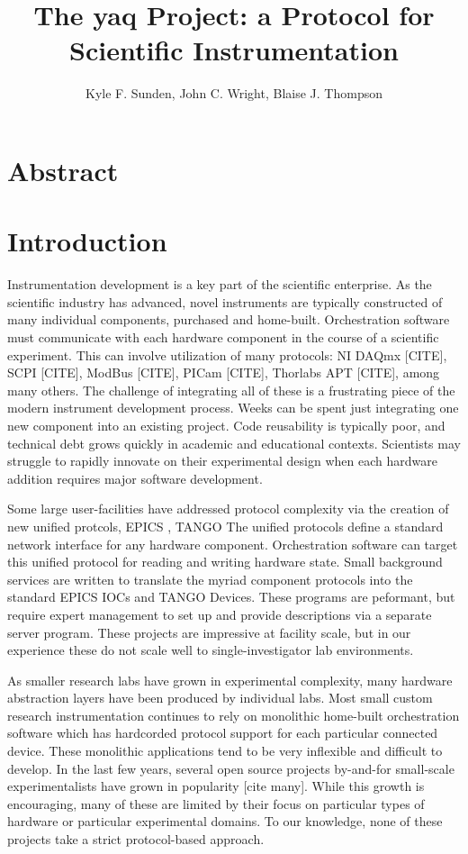 \documentclass{article}
\title{The yaq Project: a Protocol for Scientific Instrumentation}
\author{Kyle F. Sunden,
  John C. Wright,
  Blaise J. Thompson}
\begin{document}
\maketitle

\section{Abstract}

\section{Introduction}

Instrumentation development is a key part of the scientific enterprise.
As the scientific industry has advanced, novel instruments are typically constructed of many individual components, purchased and home-built. %
Orchestration software must communicate with each hardware component in the course of a scientific experiment.
This can involve utilization of many protocols: NI DAQmx [CITE], SCPI [CITE], ModBus [CITE], PICam [CITE], Thorlabs APT [CITE], among many others.
The challenge of integrating all of these is a frustrating piece of the modern instrument development process.
Weeks can be spent just integrating one new component into an existing project.
Code reusability is typically poor, and technical debt grows quickly in academic and educational contexts.
Scientists may struggle to rapidly innovate on their experimental design when each hardware addition requires major software development.

Some large user-facilities have addressed protocol complexity via the creation of new unified protcols, EPICS \cite{DalesioLR1991a}, TANGO \cite{tango-controls.org}
The unified protocols define a standard network interface for any hardware component.
Orchestration software can target this unified protocol for reading and writing hardware state.
Small background services are written to translate the myriad component protocols into the standard EPICS IOCs and TANGO Devices.
These programs are peformant, but require expert management to set up and provide descriptions via a separate server program.
These projects are impressive at facility scale, but in our experience these do not scale well to single-investigator lab environments.

As smaller research labs have grown in experimental complexity, many hardware abstraction layers have been produced by individual labs.
Most small custom research instrumentation continues to rely on monolithic home-built orchestration software which has hardcorded protocol support for each particular connected device.
These monolithic applications tend to be very inflexible and difficult to develop.
In the last few years, several open source projects by-and-for small-scale experimentalists have grown in popularity [cite many].
While this growth is encouraging, many of these are limited by their focus on particular types of hardware or particular experimental domains.
To our knowledge, none of these projects take a strict protocol-based approach.
 
\end{document}
